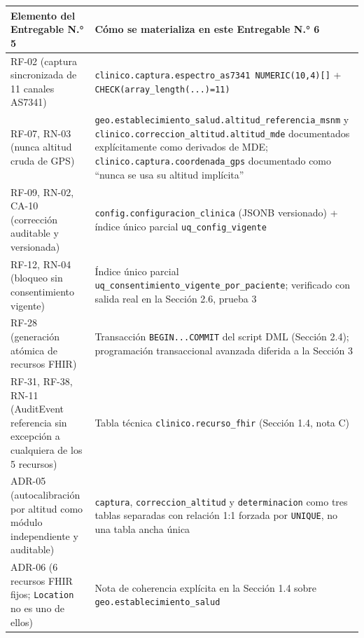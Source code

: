 \documentclass[11pt,a4paper]{article}
\begin{document}
{\small
\begin{longtable}[]{@{}
  >{\raggedright\arraybackslash}p{}
  >{\raggedright\arraybackslash}p{}@{}}
\toprule\noalign{}
\begin{minipage}[b]{\linewidth}\raggedright
Elemento del Entregable N.° 5
\end{minipage} & \begin{minipage}[b]{\linewidth}\raggedright
Cómo se materializa en este Entregable N.° 6
\end{minipage} \\
\midrule\noalign{}
\endhead
\bottomrule\noalign{}
\endlastfoot
RF-02 (captura sincronizada de 11 canales AS7341) & \texttt{clinico.captura.espectro\_as7341\ NUMERIC(10,4){[}{]}} + \texttt{CHECK(array\_length(...)=11)} \\
RF-07, RN-03 (nunca altitud cruda de GPS) & \texttt{geo.establecimiento\_salud.altitud\_referencia\_msnm} y \texttt{clinico.correccion\_altitud.altitud\_mde} documentados explícitamente como derivados de MDE; \texttt{clinico.captura.coordenada\_gps} documentado como ``nunca se usa su altitud implícita'' \\
RF-09, RN-02, CA-10 (corrección auditable y versionada) & \texttt{config.configuracion\_clinica} (JSONB versionado) + índice único parcial \texttt{uq\_config\_vigente} \\
RF-12, RN-04 (bloqueo sin consentimiento vigente) & Índice único parcial \texttt{uq\_consentimiento\_vigente\_por\_paciente}; verificado con salida real en la Sección 2.6, prueba 3 \\
RF-28 (generación atómica de recursos FHIR) & Transacción \texttt{BEGIN...COMMIT} del script DML (Sección 2.4); programación transaccional avanzada diferida a la Sección 3 \\
RF-31, RF-38, RN-11 (AuditEvent referencia sin excepción a cualquiera de los 5 recursos) & Tabla técnica \texttt{clinico.recurso\_fhir} (Sección 1.4, nota C) \\
ADR-05 (autocalibración por altitud como módulo independiente y auditable) & \texttt{captura}, \texttt{correccion\_altitud} y \texttt{determinacion} como tres tablas separadas con relación 1:1 forzada por \texttt{UNIQUE}, no una tabla ancha única \\
ADR-06 (6 recursos FHIR fijos; \texttt{Location} no es uno de ellos) & Nota de coherencia explícita en la Sección 1.4 sobre \texttt{geo.establecimiento\_salud} \\

\end{longtable}}
\end{document}
